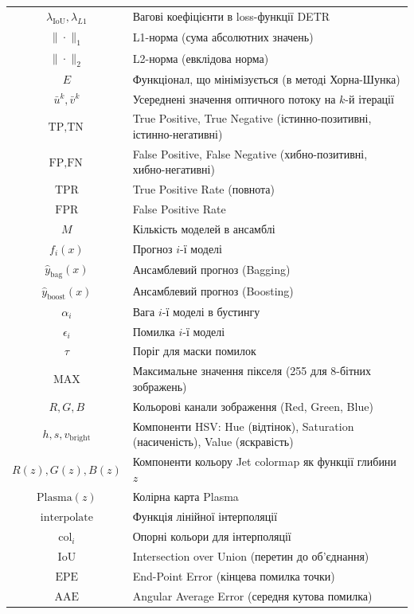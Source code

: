 \documentclass[14pt, a4paper]{extarticle}
\numberwithin{equation}{section}
\begin{document}
\begin{longtable}{|c|l|}
$\lambda_{\text{IoU}}, \lambda_{L1}$ & Вагові коефіцієнти в loss-функції DETR \\
$\|\cdot\|_1$ & L1-норма (сума абсолютних значень) \\
$\|\cdot\|_2$ & L2-норма (евклідова норма) \\
$E$ & Функціонал, що мінімізується (в методі Хорна-Шунка) \\
$\bar{u}^k, \bar{v}^k$ & Усереднені значення оптичного потоку на $k$-й ітерації \\
$\text{TP}, \text{TN}$ & True Positive, True Negative (істинно-позитивні, істинно-негативні) \\
$\text{FP}, \text{FN}$ & False Positive, False Negative (хибно-позитивні, хибно-негативні) \\
$\text{TPR}$ & True Positive Rate (повнота) \\
$\text{FPR}$ & False Positive Rate \\
$M$ & Кількість моделей в ансамблі \\
$f_i(x)$ & Прогноз $i$-ї моделі \\
$\hat{y}_{\text{bag}}(x)$ & Ансамблевий прогноз (Bagging) \\
$\hat{y}_{\text{boost}}(x)$ & Ансамблевий прогноз (Boosting) \\
$\alpha_i$ & Вага $i$-ї моделі в бустингу \\
$\epsilon_i$ & Помилка $i$-ї моделі \\
$\tau$ & Поріг для маски помилок \\
$\text{MAX}$ & Максимальне значення пікселя (255 для 8-бітних зображень) \\
$R, G, B$ & Кольорові канали зображення (Red, Green, Blue) \\
$h, s, v_{\text{bright}}$ & Компоненти HSV: Hue (відтінок), Saturation (насиченість), Value (яскравість) \\
$R(z), G(z), B(z)$ & Компоненти кольору Jet colormap як функції глибини $z$ \\
$\text{Plasma}(z)$ & Колірна карта Plasma \\
$\text{interpolate}$ & Функція лінійної інтерполяції \\
$\text{col}_i$ & Опорні кольори для інтерполяції \\
$\text{IoU}$ & Intersection over Union (перетин до об'єднання) \\
$\text{EPE}$ & End-Point Error (кінцева помилка точки) \\
$\text{AAE}$ & Angular Average Error (середня кутова помилка) \\

\end{longtable}
\end{document}
